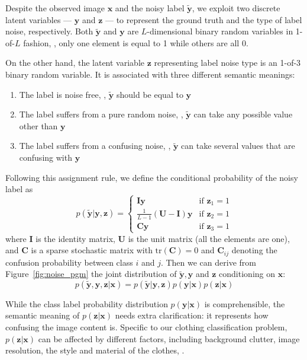 \documentclass[10pt,twocolumn,letterpaper]{article}
\def\vec{\mathbf}
\def\mat{\mathbf}
\begin{document}
Despite the observed image $\vec{x}$ and the noisy label $\tilde{\vec{y}}$, we exploit two discrete latent variables --- $\vec{y}$ and $\vec{z}$ --- to represent the ground truth and the type of label noise, respectively. Both $\tilde{\vec{y}}$ and $\vec{y}$ are $L$-dimensional binary random variables in 1-of-$L$ fashion, \ie, only one element is equal to 1 while others are all 0.

On the other hand, the latent variable $\vec{z}$ representing label noise type is an 1-of-3 binary random variable. It is associated with three different semantic meanings:
\begin{enumerate}
    \item The label is noise free, \ie, $\tilde{\vec{y}}$ should be equal to $\vec{y}$
    \item The label suffers from a pure random noise, \ie, $\tilde{\vec{y}}$ can take any possible value other than $\vec{y}$
    \item The label suffers from a confusing noise, \ie, $\tilde{\vec{y}}$ can take several values that are confusing with $\vec{y}$
\end{enumerate}

Following this assignment rule, we define the conditional probability of the noisy label as
\begin{equation} \label{eq:likelihood}
    p(\tilde{\vec{y}}|\vec{y},\vec{z}) = \begin{cases}
        \mat{I}\vec{y} & \text{if } \vec{z}_1 = 1 \\
        \frac{1}{L-1}(\mat{U} - \mat{I})\vec{y} & \text{if } \vec{z}_2 = 1 \\
        \mat{C}\vec{y} & \text{if } \vec{z}_3 = 1
    \end{cases}
\end{equation}
where $\mat{I}$ is the identity matrix, $\mat{U}$ is the unit matrix (all the elements are one), and $\mat{C}$ is a sparse stochastic matrix with $\mathrm{tr}(\mat{C})=0$ and $\mat{C}_{ij}$ denoting the confusion probability between class $i$ and $j$. Then we can derive from Figure~\ref{fig:noise_pgm} the joint distribution of $\tilde{\vec{y}}, \vec{y}$ and $\vec{z}$ conditioning on $\vec{x}$:
\begin{equation} \label{eq:joint_distribution}
  p(\tilde{\vec{y}}, \vec{y}, \vec{z} | \vec{x}) = p(\tilde{\vec{y}} | \vec{y}, \vec{z}) p(\vec{y} | \vec{x}) p(\vec{z} | \vec{x})
\end{equation}

While the class label probability distribution $p(\vec{y} | \vec{x})$ is comprehensible, the semantic meaning of $p(\vec{z} | \vec{x})$ needs extra clarification: it represents how confusing the image content is. Specific to our clothing classification problem, $p(\vec{z} | \vec{x})$ can be affected by different factors, including background clutter, image resolution, the style and material of the clothes, \etc.
\end{document}
